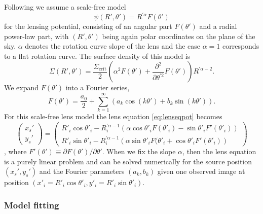 \documentclass[useAMS,usenatbib]{mnras}
\begin{document}
Following \citet{EvansWitt} we assume a scale-free model
\begin{equation}
\psi(R',\theta') = R^{'\alpha} F(\theta') \label{eq:scalefreemodel}
\end{equation}
for the lensing potential, consisting of an angular part $F(\theta')$ and a radial power-law part, with $(R',\theta')$ being again polar coordinates on the plane of the sky. $\alpha$ denotes the rotation curve slope of the lens and the case $\alpha = 1$ corresponds to a flat rotation curve. The surface density of this model is 
\begin{equation*}
\Sigma(R',\theta')= \frac{ \Sigma_\text{crit}}{2} \left(\alpha^2 F(\theta') + \frac{\partial^2}{\partial \theta^{'2}}F(\theta')\right) R^{'\alpha-2}.
\end{equation*}
We expand $F(\theta')$ into a Fourier series,
\begin{equation}
F(\theta') = \frac{a_0}{2} + \sum_{k=1}^{\infty} \left(a_k \cos(k\theta') + b_k \sin (k\theta') \right). \label{eq:Fourieransatz}
\end{equation}
For this scale-free lens model the lens equation \eqref{eq:lenseqpot} becomes
\begin{equation}
\begin{pmatrix} x_s' \\ y_s' \end{pmatrix} = \begin{pmatrix} R'_i \cos \theta'_i - R_i^{'\alpha-1} \left(\alpha \cos \theta'_i F(\theta'_i) - \sin \theta'_i F'(\theta'_i) \right) \\ R'_i \sin \theta'_i - R_i^{'\alpha-1} \left(\alpha \sin \theta'_i F(\theta'_i + \cos \theta'_i F'(\theta'_i) \right)\end{pmatrix}\label{eq:Fourierlenseq}
\end{equation}
\citep{EvansWitt}, where $F'(\theta') \equiv \partial F(\theta') / \partial \theta'$. When we fix the slope $\alpha$, then the lens equation is a purely linear problem and can be solved numerically for the source position $(x_s',y_s')$ and the Fourier parameters $(a_k,b_k)$ given one observed image at position $(x'_i=R'_i \cos \theta'_i,y'_i=R'_i \sin \theta'_i)$. 

\subsubsection{Model fitting}
\end{document}
